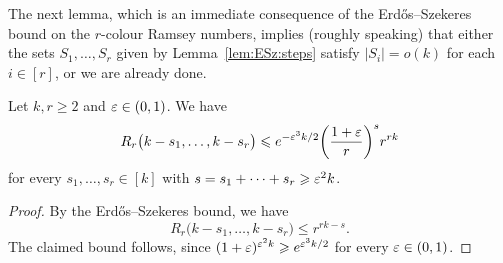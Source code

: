The next lemma, which is an immediate consequence of the Erd\H{o}s--Szekeres bound on the $r$-colour Ramsey numbers, implies (roughly speaking) that either the sets $S_1,\dots,S_r$ given by Lemma~\ref{lem:ESz:steps} satisfy $|S_i| = o(k)$ for each $i \in [r]$, or we are already done.

\begin{lemma}\label{lem:many:ESz:steps}
Let\/ $k,r \ge 2$ and\/ $\varepsilon \in (0,1)$. We have 
$$R_r\big( k - s_1, \ldots, k - s_r \big) \leqslant e^{-\varepsilon^3 k / 2} \bigg( \frac{1+\varepsilon}{r} \bigg)^s r^{rk}$$
for every $s_1,\ldots,s_r \in [k]$ with\/ $s = s_1 + \cdots + s_r \geqslant \varepsilon^2 k$.
\end{lemma}

\begin{proof}
By the Erd\H{o}s--Szekeres bound, we have
$$R_r\big( k - s_1, \ldots, k - s_r \big) \le r^{rk - s}.$$
The claimed bound follows, since $( 1 + \varepsilon )^{\varepsilon^2 k} \geqslant e^{\varepsilon^3 k/2}$ for every $\varepsilon \in (0,1)$.
\end{proof}





